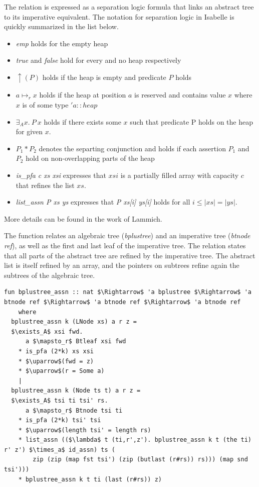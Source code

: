 \documentclass[a4paper,UKenglish,cleveref, autoref, thm-restate]{lipics-v2021}
\begin{document}
The relation is expressed as a separation logic formula that links an abstract tree to its
imperative equivalent.
The notation for separation logic in Isabelle is quickly summarized in the list below.
\begin{itemize}
    \item \textit{emp} holds for the empty heap
    \item \textit{true} and \textit{false} hold for every and no heap respectively
    \item $\uparrow(P)$ holds if the heap is empty and predicate $P$ holds
    \item $a \mapsto_r x$ holds if the heap at position $a$ is reserved and contains
    value $x$ where $x$ is of some type $'a::heap$
    \item $\exists_A x.\ P\ x$ holds if there exists some $x$ such that predicate P
    holds on the heap for given $x$.
    \item $P_1 * P_2$ denotes the separting conjunction and holds if each assertion $P_1$ and $P_2$ hold on non-overlapping parts
    of the heap
    \item \emph{is\_pfa c xs xsi} expresses that $xsi$ is a partially filled array
    with capacity $c$ that refines the list $xs$.
    \item \emph{list\_assn P xs ys} expresses that \emph{P xs[i] ys[i]} holds for all $i \leq |xs| = |ys|$.
\end{itemize}
More details can be found in the work of Lammich. \cite{DBLP:journals/afp/LammichM12}

The function relates an algebraic tree (\emph{bplustree})
and an imperative tree (\emph{btnode ref}), as well as the first and last leaf of the imperative tree.
The relation states that all parts of the abstract tree
are refined by the imperative tree.
The abstract list is itself refined by an array,
and the pointers on subtrees refine again the subtrees of the algebraic tree.

\begin{lstlisting}[mathescape=true, language=Isabelle,label=lst:btree-relation]
fun bplustree_assn :: nat $\Rightarrow$ 'a bplustree $\Rightarrow$ 'a btnode ref $\Rightarrow$ 'a btnode ref $\Rightarrow$ 'a btnode ref
    where
  bplustree_assn k (LNode xs) a r z =
  $\exists_A$ xsi fwd.
      a $\mapsto_r$ Btleaf xsi fwd
    * is_pfa (2*k) xs xsi
    * $\uparrow$(fwd = z)
    * $\uparrow$(r = Some a)
    |
  bplustree_assn k (Node ts t) a r z =
  $\exists_A$ tsi ti tsi' rs.
      a $\mapsto_r$ Btnode tsi ti
    * is_pfa (2*k) tsi' tsi
    * $\uparrow$(length tsi' = length rs)
    * list_assn (($\lambda$ t (ti,r',z'). bplustree_assn k t (the ti) r' z') $\times_a$ id_assn) ts (
        zip (zip (map fst tsi') (zip (butlast (r#rs)) rs))) (map snd tsi')))
    * bplustree_assn k t ti (last (r#rs)) z)
\end{lstlisting}
\end{document}
